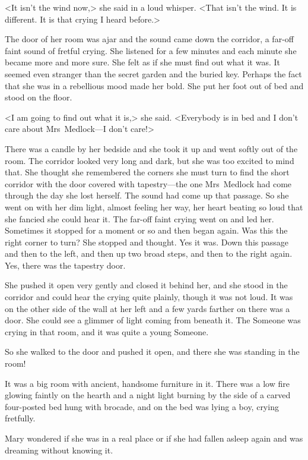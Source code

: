 <It isn't the wind now,> she said in a loud whisper. <That isn't the wind. It is different. It is that crying I heard before.>

The door of her room was ajar and the sound came down the corridor, a far-off faint sound of fretful crying. She listened for a few minutes and each minute she became more and more sure. She felt as if she must find out what it was. It seemed even stranger than the secret garden and the buried key. Perhaps the fact that she was in a rebellious mood made her bold. She put her foot out of bed and stood on the floor.

<I am going to find out what it is,> she said. <Everybody is in bed and I don't care about Mrs~Medlock—I don't care!>

There was a candle by her bedside and she took it up and went softly out of the room. The corridor looked very long and dark, but she was too excited to mind that. She thought she remembered the corners she must turn to find the short corridor with the door covered with tapestry—the one Mrs~Medlock had come through the day she lost herself. The sound had come up that passage. So she went on with her dim light, almost feeling her way, her heart beating so loud that she fancied she could hear it. The far-off faint crying went on and led her. Sometimes it stopped for a moment or so and then began again. Was this the right corner to turn? She stopped and thought. Yes it was. Down this passage and then to the left, and then up two broad steps, and then to the right again. Yes, there was the tapestry door.

She pushed it open very gently and closed it behind her, and she stood in the corridor and could hear the crying quite plainly, though it was not loud. It was on the other side of the wall at her left and a few yards farther on there was a door. She could see a glimmer of light coming from beneath it. The Someone was crying in that room, and it was quite a young Someone.

So she walked to the door and pushed it open, and there she was standing in the room!

It was a big room with ancient, handsome furniture in it. There was a low fire glowing faintly on the hearth and a night light burning by the side of a carved four-posted bed hung with brocade, and on the bed was lying a boy, crying fretfully.

Mary wondered if she was in a real place or if she had fallen asleep again and was dreaming without knowing it.

